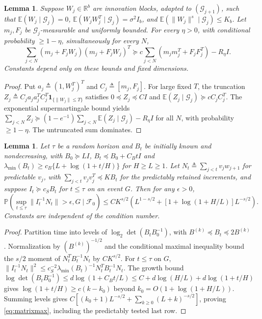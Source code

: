 \documentclass[11pt,reqno]{amsart}
\numberwithin{equation}{section}
\newtheorem{lemma}[theorem]{Lemma}
\theoremstyle{definition}
\theoremstyle{remark}
\newcommand{\E}{\mathbb E}
\newcommand{\Prob}{\mathbb P}
\newcommand{\F}{\mathcal F}
\newcommand{\ind}{\mathbf 1}
\begin{document}
\begin{lemma}\label{lem:outer}
Suppose $W_j\in\mathbb R^b$ are innovation blocks, adapted to $(\mathcal G_{j+1})$, such that
$\E(W_j\mid\mathcal G_j)=0$, $\E(W_jW_j^T\mid\mathcal G_j)=\sigma^2I_b$, and $\E(\|W_j\|^s\mid\mathcal G_j)\le K_b$. Let $m_j,F_j$ be $\mathcal G_j$-measurable and uniformly bounded. For every $\eta>0$, with conditional probability $\ge1-\eta$, simultaneously for every $N$,
\begin{equation*}
 \sum_{j<N}(m_j+F_jW_j)(m_j+F_jW_j)^T
 \succeq c\sum_{j<N}(m_jm_j^T+F_jF_j^T)-R_\eta I.
\end{equation*}
Constants depend only on these bounds and fixed dimensions.
\end{lemma}
\begin{proof}
Put $a_j\triangleq(1,W_j^T)^T$ and $C_j\triangleq[m_j,F_j]$. For large fixed $T$, the truncation $Z_j\triangleq C_ja_ja_j^T C_j^T\ind_{\{\|W_j\|\le T\}}$ satisfies $0\preceq Z_j\preceq CI$ and $\E(Z_j\mid\mathcal G_j)\succeq cC_jC_j^T$. The exponential supermartingale bound \cite{Tropp11} yields $\sum_{j<N}Z_j\succeq(1-e^{-1})\sum_{j<N}\E(Z_j\mid\mathcal G_j)-R_\eta I$ for all $N$, with probability $\ge1-\eta$. The untruncated sum dominates.
\end{proof}

\begin{lemma}\label{lem:matrixmax}
Let $\tau$ be a random horizon and $B_t$ be initially known and nondecreasing, with $B_0\succeq LI$, $B_t\preceq B_0+C_BtI$ and $\lambda_{\min}(B_t)\ge c_B\{L+\log(1+t/H)\}$ for $H\ge L\ge1$. Let $N_t\triangleq\sum_{j<t}v_jw_{j+1}$ for predictable $v_j$, with $\sum_{j<t}v_jv_j^T\preceq KB_t$ for the predictably retained increments, and suppose $I_t\succeq c_SB_t$ for $t\le\tau$ on an event $G$. Then for any $\epsilon>0$,
\begin{equation}\label{eq:matrixmax}
 \Prob\left(\sup_{t\le\tau}\|I_t^{-1}N_t\|>\epsilon, G\mid\F_0\right)
 \le CK^{s/2}\left(L^{1-s/2}+[1+\log(1+H/L)]L^{-s/2}\right).
\end{equation}
Constants are independent of the condition number.
\end{lemma}
\begin{proof}
Partition time into levels of $\log_2\det(B_tB_0^{-1})$, with $B^{(k)}\preceq B_t\preceq2B^{(k)}$. Normalization by $(B^{(k)})^{-1/2}$ and the conditional maximal inequality bound the $s/2$ moment of $N_t^T B_t^{-1}N_t$ by $CK^{s/2}$. For $t\le\tau$ on $G$, $\|I_t^{-1}N_t\|^2\le c_S^{-2}\lambda_{\min}(B_t)^{-1}N_t^TB_t^{-1}N_t$. The growth bound $\log\det(B_tB_0^{-1})\le d\log(1+C_Bt/L)\le C+d\log(H/L)+d\log(1+t/H)$ gives $\log(1+t/H)\ge c(k-k_0)$ beyond $k_0=O(1+\log(1+H/L))$. Summing levels gives $C[(k_0+1)L^{-s/2}+\sum_{k\ge0}(L+k)^{-s/2}]$, proving \eqref{eq:matrixmax}, including the predictably tested last row.
\end{proof}
\end{document}
